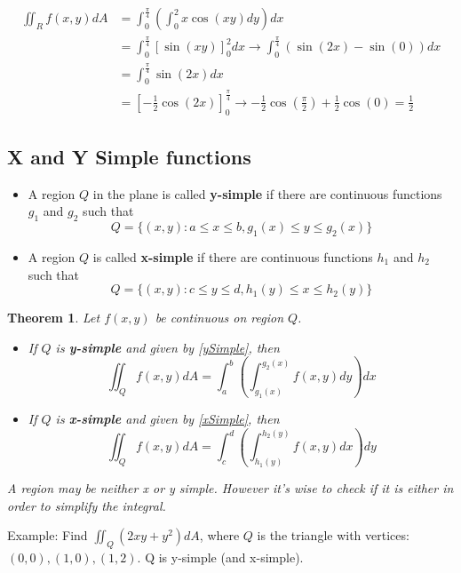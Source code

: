 \documentclass{article}
\newtheorem{theorem}{Theorem}[section]
\newcommand{\nn}{\leavevmode \newline \newline} %
\numberwithin{equation}{subsection} %
\begin{document}
\begin{equation}
    \begin{split}
        \iint_R f(x,y) dA &= \int_0^{\frac{\pi}{4}} \left( \int_0^2 x\cos(xy)dy\right)dx \\
        &= \int_0^{\frac{\pi}{4}} \left[ \sin(xy) \right]_0^2 dx \to \int_0^{\frac{\pi}{4}}(\sin(2x)-\sin(0))dx \\
        &= \int_0^{\frac{\pi}{4}} \sin(2x)dx \\
        &= \left[ -\frac{1}{2}\cos(2x)\right]_0^{\frac{\pi}{4}} \to -\frac{1}{2}\cos(\frac{\pi}{2}) + \frac{1}{2}\cos(0) = \frac{1}{2}
    \end{split}
\end{equation}
\subsection{X and Y Simple functions}
\begin{itemize}
    \item A region $Q$ in the plane is called \textbf{y-simple} if there are continuous functions $g_1$ and $g_2$ such that
    \begin{equation}
        Q=\{(x,y): a\leq x \leq b, g_1(x) \leq y \leq g_2(x) \}
        \label{ySimple}
    \end{equation}
    \item A region $Q$ is called \textbf{x-simple} if there are continuous functions $h_1$ and $h_2$ such that 
    \begin{equation}
        Q=\{(x,y): c \leq y \leq d, h_1(y) \leq x \leq h_2(y)\}
        \label{xSimple}
    \end{equation}
\end{itemize}
\begin{theorem}
Let $f(x,y)$ be continuous on region $Q$. 
\begin{itemize}
    \item If $Q$ is \textbf{y-simple} and given by \eqref{ySimple}, then
    \begin{equation}
        \iint_Q f(x,y) dA = \int_a^b \left(\int_{g_1(x)}^{g_2(x)} f(x,y)dy\right) dx
    \end{equation}
    \item If $Q$ is \textbf{x-simple} and given by \eqref{xSimple}, then
    \begin{equation}
        \iint_Q f(x,y) dA = \int_c^d \left(\int_{h_1(y)}^{h_2(y)} f(x,y)dx\right) dy
    \end{equation}
\end{itemize}
A region may be neither x or y simple. However it's wise to check if it is either in order to simplify the integral.
\end{theorem}
\nn
Example: Find $\iint_Q (2xy+y^2) dA$, where $Q$ is the triangle with vertices: $(0,0), (1,0), (1,2)$. Q is y-simple (and x-simple).
\end{document}
